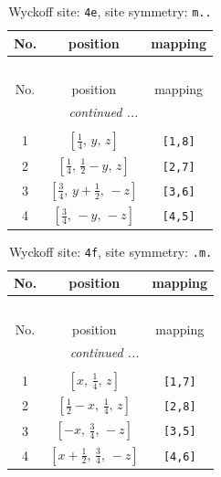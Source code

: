 \documentclass[fleqn,8pt]{jsarticle}
\begin{document}
\renewcommand{\arraystretch}{1.2}
\begin{longtable}{ccc}
\caption{Wyckoff site: {\tt 4e}, site symmetry: {\tt m..}}
 \\
 \hline \hline
No. & position & mapping \\ \hline \endfirsthead

\multicolumn{2}{l}{\tablename\ \thetable{}} \\
 \hline \hline
No. & position & mapping \\ \hline \endhead

 \hline \hline
\multicolumn{2}{r}{\footnotesize\it continued ...} \\ \endfoot

 \hline \hline
\multicolumn{2}{r}{} \\ \endlastfoot

1 & $\left[ \frac{1}{4},\, y,\, z \right]$ & {\tt [1,8]} \\ \hline
2 & $\left[ \frac{1}{4},\, \frac{1}{2} - y,\, z \right]$ & {\tt [2,7]} \\ \hline
3 & $\left[ \frac{3}{4},\, y + \frac{1}{2},\, - z \right]$ & {\tt [3,6]} \\ \hline
4 & $\left[ \frac{3}{4},\, - y,\, - z \right]$ & {\tt [4,5]} \\
\end{longtable}
\renewcommand{\arraystretch}{1.2}
\begin{longtable}{ccc}
\caption{Wyckoff site: {\tt 4f}, site symmetry: {\tt .m.}}
 \\
 \hline \hline
No. & position & mapping \\ \hline \endfirsthead

\multicolumn{2}{l}{\tablename\ \thetable{}} \\
 \hline \hline
No. & position & mapping \\ \hline \endhead

 \hline \hline
\multicolumn{2}{r}{\footnotesize\it continued ...} \\ \endfoot

 \hline \hline
\multicolumn{2}{r}{} \\ \endlastfoot

1 & $\left[ x,\, \frac{1}{4},\, z \right]$ & {\tt [1,7]} \\ \hline
2 & $\left[ \frac{1}{2} - x,\, \frac{1}{4},\, z \right]$ & {\tt [2,8]} \\ \hline
3 & $\left[ - x,\, \frac{3}{4},\, - z \right]$ & {\tt [3,5]} \\ \hline
4 & $\left[ x + \frac{1}{2},\, \frac{3}{4},\, - z \right]$ & {\tt [4,6]} \\
\end{longtable}
\end{document}
